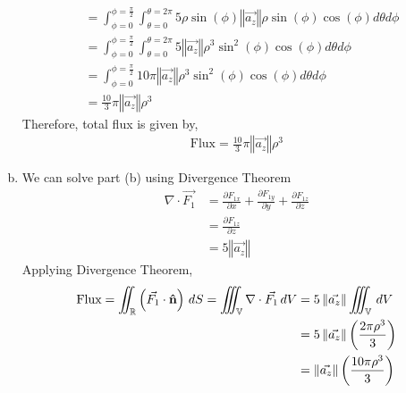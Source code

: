 \begin{problem}{}{}
\begin{enumerate}[(a)]
\begin{align*}
                &=\int_{\phi=0}^{\phi=\frac{\pi}{2}}\int_{\theta = 0}^{\theta =2\pi} 5\rho\sin\left(\phi\right)\left\Vert\vec{a_z}\right\Vert\rho \sin(\phi)\cos \left(\phi \right)d\theta d\phi\\
                &=\int_{\phi=0}^{\phi=\frac{\pi}{2}}\int_{\theta = 0}^{\theta =2\pi} 5\left\Vert\vec{a_z}\right\Vert\rho^3 \sin^2(\phi)\cos \left(\phi \right)d\theta d\phi\\
                &=\int_{\phi=0}^{\phi=\frac{\pi}{2}} 10\pi\left\Vert\vec{a_z}\right\Vert\rho^3 \sin^2(\phi)\cos \left(\phi \right)d\theta d\phi\\
                &=\frac{10}{3}\pi\left\Vert\vec{a_z}\right\Vert\rho^3
            \end{align*}
            Therefore, total flux is given by,
            \begin{align*}
                \text{Flux} = \frac{10}{3}\pi\left\Vert\vec{a_z}\right\Vert\rho^3
            \end{align*}
        \item We can solve part (b) using Divergence Theorem
        \begin{align*}
            \mathbb{\nabla}\cdot\vec{F_1} &= \frac{\partial F_{1x}}{\partial x} + \frac{\partial F_{1y}}{\partial y} + \frac{\partial F_{1z}}{\partial z}\\
            &= \frac{\partial F_{1z}}{\partial z}\\
            &= 5\left\Vert\vec{a_z}\right\Vert
        \end{align*}
        Applying Divergence Theorem, 
        \begin{align*}
            \text{Flux} = \iint_{\mathbb{R}} \left(\vec{F_1}\cdot\boldsymbol{\hat{\textbf{n}}}\right)\,dS = \iiint_{\mathbb{V}}
            \mathbb{\nabla}\cdot\vec{F_1}\,dV &= 5\left\Vert\vec{a_z}\right\Vert \iiint_{\mathbb{V}}\, dV\\
            &= 5\left\Vert\vec{a_z}\right\Vert\left(\frac{2\pi\rho^3}{3}\right)\\
            &= \left\Vert\vec{a_z}\right\Vert\left(\frac{10\pi\rho^3}{3}\right)
        \end{align*}
    \end{enumerate}
\end{problem}

